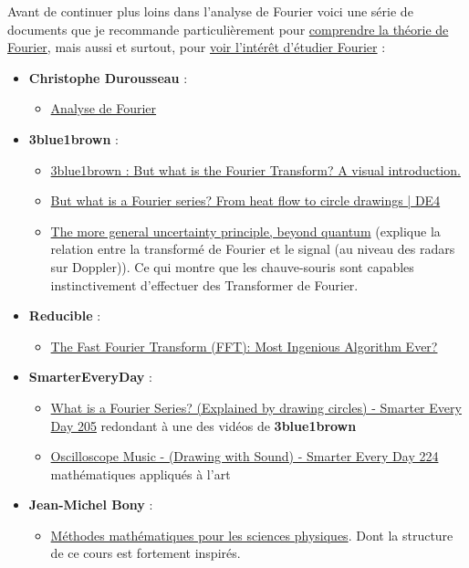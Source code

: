 \documentclass[a4paper]{book}
\begin{document}
Avant de continuer plus loins dans l'analyse de Fourier voici une série de
documents que je recommande particulièrement pour \underline{comprendre la
théorie de Fourier}, mais aussi et surtout, pour \underline{voir l'intérêt
d'étudier Fourier} :
\begin{itemize}
	\item \textbf{Christophe Durousseau} :
		\begin{itemize}
			\item \underline{Analyse de Fourier}
		\end{itemize}
	\item \textbf{3blue1brown} :
		\begin{itemize}
			\item \href{https://www.youtube.com/watch?v=spUNpyF58BY}
				{3blue1brown : But what is the Fourier Transform? 
				A visual introduction.}
			\item \href{https://www.youtube.com/watch?v=r6sGWTCMz2k}{But
				what is a Fourier series? From heat flow to
				circle drawings | DE4}
			\item \href{https://www.youtube.com/watch?v=MBnnXbOM5S4}{The
				more general uncertainty principle, beyond
				quantum} (explique la relation entre la
				transformé de Fourier et le signal (au niveau
				des radars sur Doppler)). Ce qui montre que les
				chauve-souris sont capables instinctivement
				d'effectuer des Transformer de Fourier.
		\end{itemize}
	\item \textbf{Reducible} :
		\begin{itemize}
			\item \href{https://www.youtube.com/watch?v=h7apO7q16V0}{The
				Fast Fourier Transform (FFT): Most Ingenious
				Algorithm Ever?}
		\end{itemize}
	\item \textbf{SmarterEveryDay} :
		\begin{itemize}
			\item \href{https://www.youtube.com/watch?v=ds0cmAV-Yek}{
					What is a Fourier Series? (Explained by
					drawing circles) - Smarter Every Day
					205} redondant à une des vidéos de
					\textbf{3blue1brown} 
			\item \href{https://www.youtube.com/watch?v=4gibcRfp4zA}{
					Oscilloscope Music - (Drawing with
					Sound) - Smarter Every Day 224} 
					mathématiques appliqués à l'art
		\end{itemize}
	\item \textbf{Jean-Michel Bony} :
		\begin{itemize}
			\item \underline{Méthodes mathématiques pour les sciences
				physiques}. Dont la structure de ce cours est
				fortement inspirés.
		\end{itemize}

\end{itemize}
\end{document}
